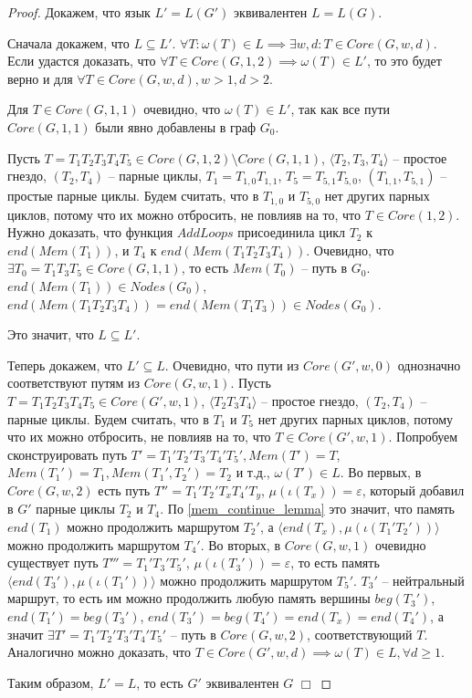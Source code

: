 \begin{proof}
    Докажем, что язык $L' = L(G')$ эквивалентен $L = L(G)$.
    
    Сначала докажем, что $L \subseteq L'$.
    $\forall T : \omega(T) \in L \implies \exists w, d : T \in Core(G, w, d)$.
    Если удастся доказать, что $\forall T \in Core(G, 1, 2) \implies \omega(T) \in L'$, то 
    это будет верно и для $\forall T \in Core(G, w, d), w > 1, d > 2$.

    Для $T \in Core(G, 1, 1)$ очевидно, что $\omega(T) \in L'$, так как все пути $Core(G, 1, 1)$ были явно добавлены в граф $G_0$.

    Пусть $T = T_1 T_2 T_3 T_4 T_5 \in Core(G, 1, 2) \setminus Core(G, 1, 1)$, 
    $\langle T_2, T_3, T_4 \rangle$ -- простое гнездо, $(T_2, T_4)$ -- парные циклы,
    $T_1 = T_{1, 0} T_{1, 1}$,
    $T_5 = T_{5, 1} T_{5, 0}$,
    $(T_{1, 1}, T_{5, 1})$ -- простые парные циклы.
    Будем считать, что в $T_{1,0}$ и $T_{5,0}$ нет других парных циклов,
    потому что их можно отбросить, не повлияв на то, что $T \in Core(1, 2)$. 
    Нужно доказать, что функция $AddLoops$ присоединила цикл $T_2$ к $end(Mem(T_1))$, 
    и $T_4$ к $end(Mem(T_1 T_2 T_3 T_4))$.
    Очевидно, что $\exists T_0 = T_1 T_3 T_5 \in Core(G, 1, 1)$, то есть $Mem(T_0)$ -- путь в $G_0$. 
    $end(Mem(T_1)) \in Nodes(G_0)$, $end(Mem(T_1 T_2 T_3 T_4)) = end(Mem(T_1 T_3)) \in Nodes(G_0)$.

    Это значит, что $L \subseteq L'$.

    Теперь докажем, что $L' \subseteq L$. 
    Очевидно, что пути из $Core(G', w, 0)$ однозначно соответствуют путям из $Core(G, w, 1)$. 
    Пусть $T = T_1 T_2 T_3 T_4 T_5 \in Core(G', w, 1)$, 
    $\langle T_2 T_3 T_4 \rangle$ -- простое гнездо, $(T_2, T_4)$ -- парные циклы.
    Будем считать, что в $T_1$ и $T_5$ нет других парных циклов,
    потому что их можно отбросить, не повлияв на то, что $T \in Core(G',w,1)$. 
    Попробуем сконструировать путь $T' = T_1' T_2' T_3' T_4' T_5', Mem(T') = T$, 
    $Mem(T_1') = T_1, Mem(T_1', T_2') = T_2$ и т.д., $\omega(T') \in L$.
    Во первых, в $Core(G, w, 2)$ есть путь $T'' = T_1' T_2' T_x T_4' T_y$, $\mu(\iota(T_x)) = \varepsilon$, 
    который добавил в $G'$ парные циклы $T_2$ и $T_4$.
    По \ref{mem_continue_lemma} это значит, что память $end(T_1)$ можно продолжить маршрутом $T_2'$, 
    а $\langle end(T_x), \mu(\iota(T_1' T_2')) \rangle$ можно продолжить маршрутом $T_4'$.
    Во вторых, в $Core(G, w, 1)$ очевидно существует путь $T''' = T_1' T_3' T_5'$, $\mu(\iota(T_3')) = \varepsilon$, 
    то есть память $\langle end(T_3'), \mu(\iota(T_1')) \rangle$ можно продолжить маршрутом  $T_5'$. 
    $T_3'$ -- нейтральный маршрут, то есть им можно продолжить любую память вершины $beg(T_3')$, 
    $end(T_1') = beg(T_3')$, $end(T_3') = beg(T_4') = end(T_x) = end(T_4')$, а значит 
    $\exists T' = T_1' T_2' T_3' T_4' T_5'$ -- путь в $Core(G, w, 2)$, 
    соответствующий $T$. Аналогично можно доказать, что $T \in Core(G', w, d) \implies \omega(T) \in L, \forall d \geq 1$.

    Таким образом, $L' = L$, то есть $G'$ эквивалентен $G$ $\Box$ 
    

\end{proof}

